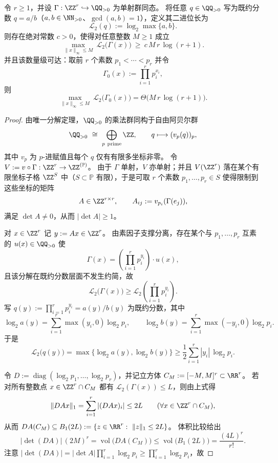 \begin{theorem}\label{thm:cdim-godel-prime-bitlength-lowerbound}
令 \(r\ge 1\)，并设 \(\Gamma:\ZZ^{r}\hookrightarrow \QQ_{>0}\) 为单射群同态。
将任意 \(q\in\QQ_{>0}\) 写为既约分数 \(q=a/b\)（\(a,b\in\NN_{>0}\)、\(\gcd(a,b)=1\)），定义其二进位长为
\[
\mathcal L_2(q):=\log_2\max\{a,b\}.
\]
则存在绝对常数 \(c>0\)，使得对任意整数 \(M\ge 1\) 成立
\[
\max_{\|x\|_\infty\le M}\ \mathcal L_2\bigl(\Gamma(x)\bigr)\ \ge\ c\,M\,r\,\log(r+1).
\]
并且该数量级可达：取前 \(r\) 个素数 \(p_1<\cdots<p_r\) 并令
\[
\Gamma_0(x):=\prod_{i=1}^r p_i^{x_i},
\]
则
\[
\max_{\|x\|_\infty\le M}\ \mathcal L_2\bigl(\Gamma_0(x)\bigr)
=
\Theta\!\bigl(M\,r\,\log(r+1)\bigr).
\]
\end{theorem}
\begin{proof}
由唯一分解定理，\(\QQ_{>0}\) 的乘法群同构于自由阿贝尔群
\[
\QQ_{>0}\ \cong\ \bigoplus_{p\ \mathrm{prime}}\ZZ,\qquad
q\longmapsto (v_p(q))_{p},
\]
其中 \(v_p\) 为 \(p\)-进赋值且每个 \(q\) 仅有有限多坐标非零。
令 \(V:=v\circ\Gamma:\ZZ^r\to\ZZ^{(\mathbb P)}\)。
由于 \(\Gamma\) 单射，\(V\) 亦单射；并且 \(V(\ZZ^r)\) 落在某个有限坐标子格 \(\ZZ^{S}\) 中（\(S\subset\mathbb P\) 有限），于是可取 \(r\) 个素数 \(p_1,\dots,p_r\in S\) 使得限制到这些坐标的矩阵
\[
A\in\ZZ^{r\times r},\qquad A_{ij}:=v_{p_i}(\Gamma(e_j)),
\]
满足 \(\det A\neq 0\)，从而 \(|\det A|\ge 1\)。
\par
对 \(x\in\ZZ^r\) 记 \(y:=Ax\in\ZZ^r\)。
由素因子支撑分离，存在某个与 \(p_1,\dots,p_r\) 互素的 \(u(x)\in\QQ_{>0}\) 使
\[
\Gamma(x)=\left(\prod_{i=1}^r p_i^{y_i}\right)\cdot u(x),
\]
且该分解在既约分数层面不发生约简，故
\[
\mathcal L_2\bigl(\Gamma(x)\bigr)
\ge
\mathcal L_2\!\left(\prod_{i=1}^r p_i^{y_i}\right).
\]
写 \(q(y):=\prod_{i=1}^r p_i^{y_i}=a(y)/b(y)\) 为既约分数，其中
\[
\log_2 a(y)=\sum_{i=1}^r \max(y_i,0)\log_2 p_i,\qquad
\log_2 b(y)=\sum_{i=1}^r \max(-y_i,0)\log_2 p_i.
\]
于是
\[
\mathcal L_2\bigl(q(y)\bigr)
=\max\{\log_2 a(y),\log_2 b(y)\}
\ge
\frac12\sum_{i=1}^r |y_i|\,\log_2 p_i.
\]
\par
令 \(D:=\operatorname{diag}(\log_2 p_1,\dots,\log_2 p_r)\)，并记立方体 \(C_M:=[-M,M]^r\subset\RR^r\)。
若对所有整数点 \(x\in\ZZ^r\cap C_M\) 都有 \(\mathcal L_2(\Gamma(x))\le L\)，则由上式得
\[
\|DAx\|_1=\sum_{i=1}^r |(DAx)_i|\le 2L
\qquad(\forall x\in \ZZ^r\cap C_M),
\]
从而 \(DA(C_M)\subseteq B_1(2L):=\{z\in\RR^r:\ \|z\|_1\le 2L\}\)。
体积比较给出
\[
|\det(DA)|\,(2M)^r
=
\operatorname{vol}\bigl(DA(C_M)\bigr)
\le
\operatorname{vol}\bigl(B_1(2L)\bigr)
=
\frac{(4L)^r}{r!}.
\]
注意 \(|\det(DA)|=|\det A|\prod_{i=1}^r\log_2 p_i\ge \prod_{i=1}^r\log_2 p_i\)，故

\end{proof}
